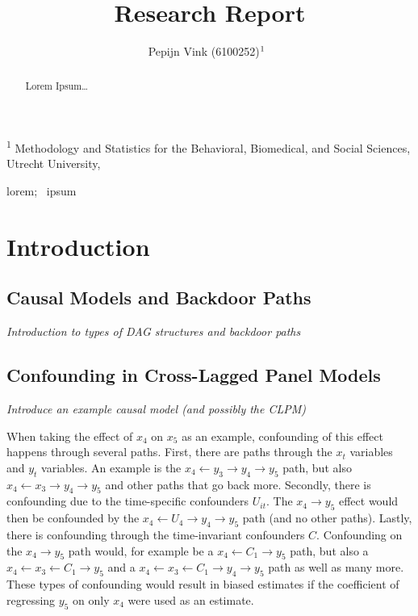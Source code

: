 \documentclass[
]{interact}
\title{Research Report}
\author{Pepijn Vink
(6100252)$\textsuperscript{1}$~\orcidlink{0000-0001-6960-9904}}
\begin{document}
\captionsetup{labelsep=space}
\maketitle
\textsuperscript{1} Methodology and Statistics for the Behavioral,
Biomedical, and Social Sciences, Utrecht University,  
\begin{abstract}
Lorem Ipsum\ldots{}
\end{abstract}
\begin{keywords}
\def\sep{;\ }
lorem\sep 
ipsum
\end{keywords}
\ifdefined\Shaded\renewenvironment{Shaded}{\begin{tcolorbox}[boxrule=0pt, interior hidden, frame hidden, enhanced, borderline west={3pt}{0pt}{shadecolor}, sharp corners, breakable]}{\end{tcolorbox}}\fi

\newcommand{\indep}{\perp \!\!\! \perp}

\hypertarget{introduction}{%
\section{Introduction}\label{introduction}}

\hypertarget{causal-models-and-backdoor-paths}{%
\subsection{Causal Models and Backdoor
Paths}\label{causal-models-and-backdoor-paths}}

\emph{Introduction to types of DAG structures and backdoor paths}

\hypertarget{confounding-in-cross-lagged-panel-models}{%
\subsection{Confounding in Cross-Lagged Panel
Models}\label{confounding-in-cross-lagged-panel-models}}

\emph{Introduce an example causal model (and possibly the CLPM)}

When taking the effect of \(x_4\) on \(x_5\) as an example, confounding
of this effect happens through several paths. First, there are paths
through the \(x_t\) variables and \(y_t\) variables. An example is the
\(x_4 \leftarrow y_3 \rightarrow y_4 \rightarrow y_5\) path, but also
\(x_4 \leftarrow x_3 \rightarrow y_4 \rightarrow y_5\) and other paths
that go back more. Secondly, there is confounding due to the
time-specific confounders \(U_{it}\). The \(x_4 \rightarrow y_5\) effect
would then be confounded by the
\(x_4 \leftarrow U_4 \rightarrow y_4 \rightarrow y_5\) path (and no
other paths). Lastly, there is confounding through the time-invariant
confounders \(C\). Confounding on the \(x_4 \rightarrow y_5\) path
would, for example be a \(x_4 \leftarrow C_1 \rightarrow y_5\) path, but
also a \(x_4 \leftarrow x_3 \leftarrow C_1 \rightarrow y_5\) and a
\(x_4 \leftarrow x_3 \leftarrow C_1 \rightarrow y_4 \rightarrow y_5\)
path as well as many more. These types of confounding would result in
biased estimates if the coefficient of regressing \(y_5\) on only
\(x_4\) were used as an estimate.
\end{document}
